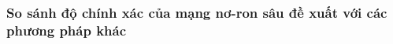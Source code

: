 \subsubsection*{\textbf{So sánh độ chính xác của mạng nơ-ron sâu đề xuất với các phương pháp khác}}

